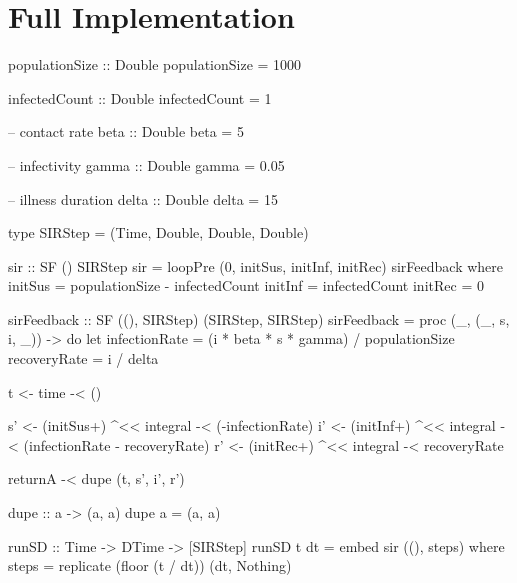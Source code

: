 \newpage

\section{Full Implementation}
\begin{HaskellCode}
populationSize :: Double
populationSize = 1000

infectedCount :: Double
infectedCount = 1

-- contact rate
beta :: Double
beta = 5

-- infectivity
gamma :: Double
gamma = 0.05

-- illness duration
delta :: Double
delta = 15

type SIRStep = (Time, Double, Double, Double)

sir :: SF () SIRStep
sir = loopPre (0, initSus, initInf, initRec) sirFeedback
  where
    initSus = populationSize - infectedCount
    initInf = infectedCount
    initRec = 0

    sirFeedback :: SF ((), SIRStep) (SIRStep, SIRStep)
    sirFeedback = proc (_, (_, s, i, _)) -> do
      let infectionRate = (i * beta * s * gamma) / populationSize
          recoveryRate  = i / delta

      t <- time -< ()

      s' <- (initSus+) ^<< integral -< (-infectionRate)
      i' <- (initInf+) ^<< integral -< (infectionRate - recoveryRate)
      r' <- (initRec+) ^<< integral -< recoveryRate

      returnA -< dupe (t, s', i', r')

    dupe :: a -> (a, a)
    dupe a = (a, a)

runSD :: Time -> DTime -> [SIRStep]
runSD t dt = embed sir ((), steps)
  where
    steps = replicate (floor (t / dt)) (dt, Nothing)
\end{HaskellCode}
